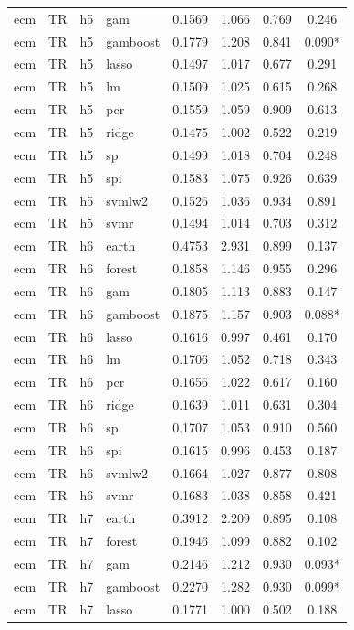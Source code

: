 \begin{ThreePartTable}
\begin{longtable}[t]{llclcccc}
ecm & TR & h5 & gam & 0.1569 & 1.066 & 0.769 & 0.246\\
ecm & TR & h5 & gamboost & 0.1779 & 1.208 & 0.841 & 0.090*\\
ecm & TR & h5 & lasso & 0.1497 & 1.017 & 0.677 & 0.291\\
ecm & TR & h5 & lm & 0.1509 & 1.025 & 0.615 & 0.268\\
ecm & TR & h5 & pcr & 0.1559 & 1.059 & 0.909 & 0.613\\
ecm & TR & h5 & ridge & 0.1475 & 1.002 & 0.522 & 0.219\\
ecm & TR & h5 & sp & 0.1499 & 1.018 & 0.704 & 0.248\\
ecm & TR & h5 & spi & 0.1583 & 1.075 & 0.926 & 0.639\\
ecm & TR & h5 & svmlw2 & 0.1526 & 1.036 & 0.934 & 0.891\\
ecm & TR & h5 & svmr & 0.1494 & 1.014 & 0.703 & 0.312\\
\addlinespace
ecm & TR & h6 & earth & 0.4753 & 2.931 & 0.899 & 0.137\\
ecm & TR & h6 & forest & 0.1858 & 1.146 & 0.955 & 0.296\\
ecm & TR & h6 & gam & 0.1805 & 1.113 & 0.883 & 0.147\\
ecm & TR & h6 & gamboost & 0.1875 & 1.157 & 0.903 & 0.088*\\
ecm & TR & h6 & lasso & 0.1616 & 0.997 & 0.461 & 0.170\\
ecm & TR & h6 & lm & 0.1706 & 1.052 & 0.718 & 0.343\\
ecm & TR & h6 & pcr & 0.1656 & 1.022 & 0.617 & 0.160\\
ecm & TR & h6 & ridge & 0.1639 & 1.011 & 0.631 & 0.304\\
ecm & TR & h6 & sp & 0.1707 & 1.053 & 0.910 & 0.560\\
ecm & TR & h6 & spi & 0.1615 & 0.996 & 0.453 & 0.187\\
ecm & TR & h6 & svmlw2 & 0.1664 & 1.027 & 0.877 & 0.808\\
ecm & TR & h6 & svmr & 0.1683 & 1.038 & 0.858 & 0.421\\
\addlinespace
ecm & TR & h7 & earth & 0.3912 & 2.209 & 0.895 & 0.108\\
ecm & TR & h7 & forest & 0.1946 & 1.099 & 0.882 & 0.102\\
ecm & TR & h7 & gam & 0.2146 & 1.212 & 0.930 & 0.093*\\
ecm & TR & h7 & gamboost & 0.2270 & 1.282 & 0.930 & 0.099*\\
ecm & TR & h7 & lasso & 0.1771 & 1.000 & 0.502 & 0.188\\

\end{longtable}
\end{ThreePartTable}
